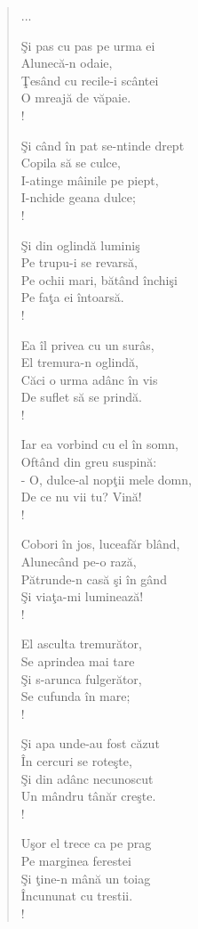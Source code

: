 \documentclass{article}
\begin{document}
\begin{small}
\begin{multicols}{3}
\begin{verse}
...

Şi pas cu pas pe urma ei \\
Alunecă-n odaie, \\
Ţesând cu recile-i scântei \\
O mreajă de văpaie. \\!

Şi când în pat se-ntinde drept \\
Copila să se culce, \\
I-atinge mâinile pe piept, \\
I-nchide geana dulce; \\!

Şi din oglindă luminiş \\
Pe trupu-i se revarsă, \\
Pe ochii mari, bătând închişi \\
Pe faţa ei întoarsă. \\!

Ea îl privea cu un surâs, \\
El tremura-n oglindă, \\
Căci o urma adânc în vis \\
De suflet să se prindă. \\!

Iar ea vorbind cu el în somn, \\
Oftând din greu suspină: \\
- O, dulce-al nopţii mele domn, \\
De ce nu vii tu? Vină! \\!

Cobori în jos, luceafăr blând, \\
Alunecând pe-o rază, \\
Pătrunde-n casă şi în gând \\
Şi viaţa-mi luminează! \\!

El asculta tremurător, \\
Se aprindea mai tare \\
Şi s-arunca fulgerător, \\
Se cufunda în mare; \\!

Şi apa unde-au fost căzut \\
În cercuri se roteşte, \\
Şi din adânc necunoscut \\
Un mândru tânăr creşte. \\!

Uşor el trece ca pe prag \\
Pe marginea ferestei \\
Şi ţine-n mână un toiag \\
Încununat cu trestii. \\!


\end{verse}
\end{multicols}
\end{small}
\end{document}
